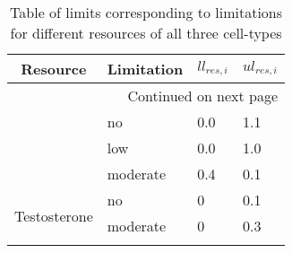 \begin{longtable}[c]{|l|l|l|l|}
  \hline  \multicolumn{1}{|c|}{\textbf{Resource}} & \multicolumn{1}{c|}{\textbf{Limitation}} & \multicolumn{1}{c|}{\textbf{$ll_{res,i}$}} & \multicolumn{1}{c|}{\textbf{$ul_{res,i}$}}  \\ \hline
  \endhead

  \hline \multicolumn{4}{|r|}{{Continued on next page}} \\ \hline
  \endfoot

  \endlastfoot

  \multirow{3}{*}{Oxygen} & no & 0.0 & 1.1 \\ \cline{2-4}
  & low & 0.0 & 1.0 \\ \cline{2-4}
  & moderate & 0.4 & 0.1 \\ \hline
  \multirow{3}{*}{Testosterone} & no & 0 & 0.1 \\ \cline{2-4}
  & moderate & 0 & 0.3 \\ \hline

  \caption[Table of resource limitations]{Table of limits corresponding to limitations for different resources of all three cell-types}
  \label{tab_all3_limits}
\end{longtable}

\newpage

